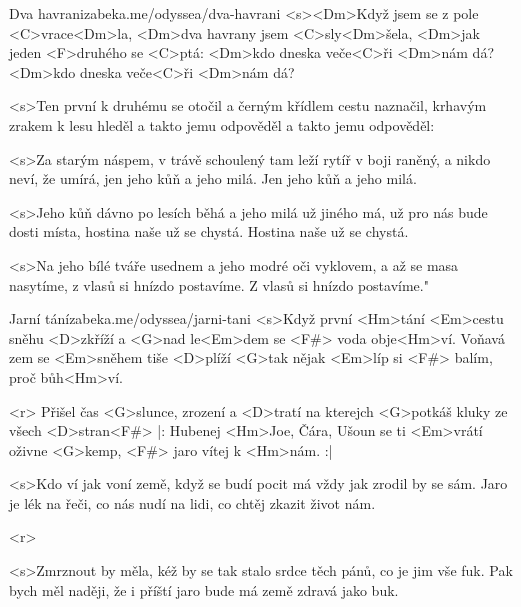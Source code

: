 \begin{song}[Asonance]{37}{Dva havrani}{zabeka.me/odyssea/dva-havrani}
	<s><Dm>Když jsem se z pole <C>vrace<Dm>la,
	<Dm>dva havrany jsem <C>sly<Dm>šela,
	<Dm>jak jeden <F>druhého se <C>ptá:
	<Dm>kdo dneska veče<C>ři <Dm>nám dá?
	<Dm>kdo dneska veče<C>ři <Dm>nám dá?

	<s>Ten první k druhému se otočil
	a černým křídlem cestu naznačil,
	krhavým zrakem k lesu hleděl
	a takto jemu odpověděl
	a takto jemu odpověděl:

	<s>Za starým náspem, v trávě schoulený
	tam leží rytíř v boji raněný,
	a nikdo neví, že umírá,
	jen jeho kůň a jeho milá.
	Jen jeho kůň a jeho milá.

	<s>Jeho kůň dávno po lesích běhá
	a jeho milá už jiného má,
	už pro nás bude dosti místa,
	hostina naše už se chystá.
	Hostina naše už se chystá.

	<s>Na jeho bílé tváře usednem
	a jeho modré oči vyklovem,
	a až se masa nasytíme,
	z vlasů si hnízdo postavíme.
	Z vlasů si hnízdo postavíme."

\end{song}
\begin{song}[Brontosauři]{38}{Jarní tání}{zabeka.me/odyssea/jarni-tani}
	<s>Když první <Hm>tání <Em>cestu sněhu <D>zkříží
	a <G>nad le<Em>dem se <F#> voda obje<Hm>ví.
	Voňavá zem se <Em>sněhem tiše <D>plíží
	<G>tak nějak <Em>líp si <F#> balím, proč bůh<Hm>ví.


	<r> Přišel čas <G>slunce, zrození a <D>tratí
	na kterejch <G>potkáš kluky ze všech <D>stran<F#>
	|: Hubenej <Hm>Joe, Čára, Ušoun se ti <Em>vrátí
	oživne <G>kemp, <F#> jaro vítej k <Hm>nám. :|


	<s>Kdo ví jak voní země, když se budí
	pocit má vždy jak zrodil by se sám.
	Jaro je lék na řeči, co nás nudí
	na lidi, co chtěj zkazit život nám.

	<r>

	<s>Zmrznout by měla, kéž by se tak stalo
	srdce těch pánů, co je jim vše fuk.
	Pak bych měl naději, že i příští jaro
	bude má země zdravá jako buk.
\end{song}
